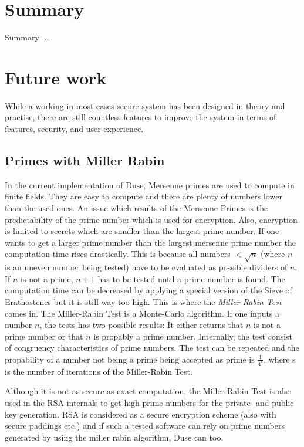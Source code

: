 \chapter{Summary}

Summary ...

\chapter{Future work}

While a working in most cases secure system has been designed in theory and
practise, there are still countless features to improve the system in terms of
features, security, and user experience.

\section{Primes with Miller Rabin}

In the current implementation of Duse, Mersenne primes are used to
compute in finite fields. They are easy to compute and there are
plenty of numbers lower than the used ones. An issue which results
of the Mersenne Primes is the predictability of the prime number
which is used for encryption. Also, encryption is limited to secrets
which are smaller than the largest prime number. If one wants to
get a larger prime number than the largest mersenne prime number the
computation time rises drastically. This is because all numbers
$< \sqrt{n}$ (where $n$ is an uneven number being tested) have to be evaluated
as possible dividers of $n$. If $n$ is not a prime, $n+1$ has to be
tested until a prime number is found. The computation time can be
decreased by applying a special version of the Sieve of Erathostenes but
it is still way too high. This is where the \textit{Miller-Rabin Test}
comes in. The Miller-Rabin Test is a Monte-Carlo algorithm. If one inputs
a number $n$, the tests has two possible results: It either returns
that $n$ is not a prime number or that $n$ is propably a prime number.
Internally, the test consist of congruency characteristics of prime numbers.
The test can be repeated and the propability of a number not being a
prime being accepted as prime is $\frac{1}{4^s}$, where s is the number
of iterations of the Miller-Rabin Test.

Although it is not as secure as exact computation, the Miller-Rabin Test
is also used in the RSA internals to get high prime numbers for the
private- and public key generation. RSA is considered as a secure
encryption scheme (also with secure paddings etc.) and if such a tested
software can rely on prime numbers generated by using the miller rabin
algorithm, Duse can too.

